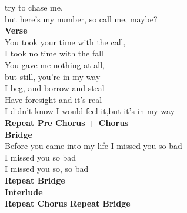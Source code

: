try to chase me,           \\               
but here's my number,    so call me, maybe?\\
\textbf{Verse}\\
You took your time with the call,\\
I took no time with the fall             \\     
You gave me nothing at all,\\
but still, you're in my way\\
I beg, and borrow and steal\\
Have foresight and it's real             \\    
I didn't know I would feel it,but it's in my way\\
\textbf{Repeat Pre Chorus + Chorus}\\
\textbf{Bridge}                   \\
Before you came into my life I missed you so bad\\
I missed you so bad\\
I missed you so, so bad\\
\textbf{Repeat Bridge}\\
\textbf{Interlude}            \\
\textbf{Repeat Chorus} \textbf{Repeat Bridge}\\





